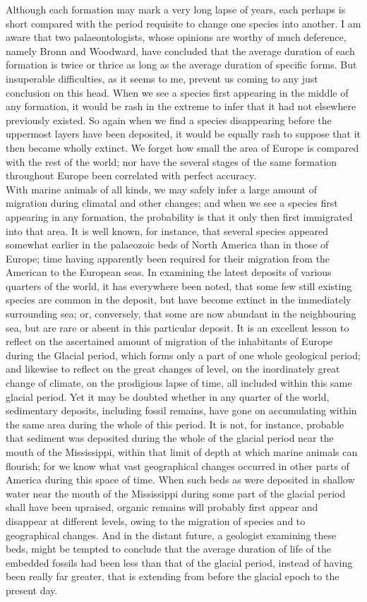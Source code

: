 \indent Although each formation may mark a very long lapse of years, each perhaps is short compared with the period requisite to change one species into another. I am aware that two palaeontologists, whose opinions are worthy of much deference, namely Bronn and Woodward, have concluded that the average duration of each formation is twice or thrice as long as the average duration of specific forms.  But insuperable difficulties, as it seems to me, prevent us coming to any just conclusion on this head. When we see a species first appearing in the middle of any formation, it would be rash in the extreme to infer that it had not elsewhere previously existed. So again when we find a species disappearing before the uppermost layers have been deposited, it would be equally rash to suppose that it then became wholly extinct. We forget how small the area of Europe is compared with the rest of the world; nor have the several stages of the same formation throughout Europe been correlated with perfect accuracy.\\
\indent With marine animals of all kinds, we may safely infer a large amount of migration during climatal and other changes; and when we see a species first appearing in any formation, the probability is that it only then first immigrated into that area. It is well known, for instance, that several species appeared somewhat earlier in the palaeozoic beds of North America than in those of Europe; time having apparently been required for their migration from the American to the European seas. In examining the latest deposits of various quarters of the world, it has everywhere been noted, that some few still existing species are common in the deposit, but have become extinct in the immediately surrounding sea; or, conversely, that some are now abundant in the neighbouring sea, but are rare or absent in this particular deposit. It is an excellent lesson to reflect on the ascertained amount of migration of the inhabitants of Europe during the Glacial period, which forms only a part of one whole geological period; and likewise to reflect on the great changes of level, on the inordinately great change of climate, on the prodigious lapse of time, all included within this same glacial period.  Yet it may be doubted whether in any quarter of the world, sedimentary deposits, including fossil remains, have gone on accumulating within the same area during the whole of this period.  It is not, for instance, probable that sediment was deposited during the whole of the glacial period near the mouth of the Mississippi, within that limit of depth at which marine animals can flourish; for we know what vast geographical changes occurred in other parts of America during this space of time. When such beds as were deposited in shallow water near the mouth of the Mississippi during some part of the glacial period shall have been upraised, organic remains will probably first appear and disappear at different levels, owing to the migration of species and to geographical changes. And in the distant future, a geologist examining these beds, might be tempted to conclude that the average duration of life of the embedded fossils had been less than that of the glacial period, instead of having been really far greater, that is extending from before the glacial epoch to the present day.\\
